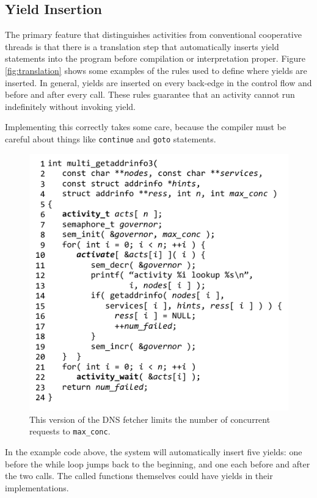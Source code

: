 \documentclass[9pt,preprint]{sigplanconf}
\begin{document}
\subsection{Yield Insertion}

The primary feature that distinguishes activities from conventional cooperative threads is that there is a translation step that automatically inserts yield statements into the program before compilation or interpretation proper.
Figure \ref{fig:translation} shows some examples of the rules used to define where yields are inserted.
In general, yields are inserted on every back-edge in the control flow and before and after every call.
These rules guarantee that an activity cannot run indefinitely without invoking yield.

Implementing this correctly takes some care, because the compiler must be careful about things like \texttt{continue} and \texttt{goto} statements.

\begin{figure}
\includegraphics{multi_getaddrinfo_sem}
\caption{This version of the DNS fetcher limits the number of concurrent requests to \texttt{max\_conc}.}
\label{fig:charcoal_multidns_sem}
\end{figure}

In the example code above, the system will automatically insert five yields: one before the while loop jumps back to the beginning, and one each before and after the two calls.
The called functions themselves could have yields in their implementations.
\end{document}
